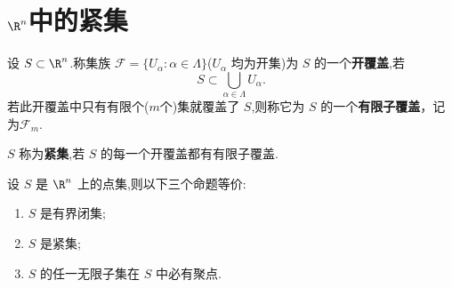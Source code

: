 \section{$\R^n$中的紧集}
\begin{definition}
设 $S\subset\R^n$.称集族 $\mathscr{F}=\{U_\alpha:\alpha\in\Lambda\}$($U_\alpha$ 均为开集)为 $S$ 的一个\textbf{开覆盖},若
\[
S\subset\bigcup_{\alpha\in\Lambda}U_\alpha.
\]
若此开覆盖中只有有限个($m$个)集就覆盖了 $S$,则称它为 $S$ 的一个\textbf{有限子覆盖}，记为$\mathscr{F}_m$.

$S$ 称为\textbf{紧集},若 $S$ 的每一个开覆盖都有有限子覆盖.
\end{definition}

\begin{theorem}\label{Heine-Borel定理}
设 $S$ 是 $\R^n$ 上的点集,则以下三个命题等价:
\begin{enumerate}[label={(\arabic*)}]
\item $S$ 是有界闭集;
\item $S$ 是紧集;
\item $S$ 的任一无限子集在 $S$ 中必有聚点.
\end{enumerate}
\end{theorem}

